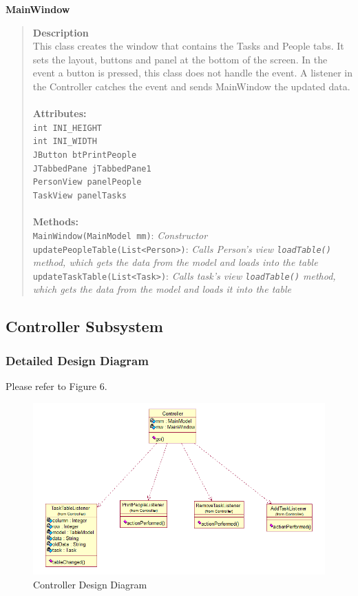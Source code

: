 \documentclass[12pt]{article}
\begin{document}
{\bf MainWindow}
\begin{quote}
{\bf Description}\\
This class creates the window that contains the Tasks and People tabs.  It sets the layout, buttons and panel at the bottom of the screen. In the event a button is pressed, this class does not handle the event.  A listener in the Controller catches the event and sends MainWindow the updated data.\\\\
{\bf Attributes:}\\
\texttt{int INI\_HEIGHT}\\
\texttt{int INI\_WIDTH}\\
\texttt{JButton btPrintPeople}\\
\texttt{JTabbedPane jTabbedPane1}\\
\texttt{PersonView panelPeople}\\
\texttt{TaskView panelTasks}\\\\
{\bf Methods:}\\
\texttt{MainWindow(MainModel mm)}:  \emph{Constructor}\\
\texttt{updatePeopleTable(List<Person>)}:  \emph{Calls Person's view \texttt{loadTable()} method, which gets the data from the model and loads into the table}\\
\texttt{updateTaskTable(List<Task>)}: \emph{Calls task's view \texttt{loadTable()} method, which gets the data from the model and loads it into the table}
\end{quote}

\subsection{Controller Subsystem}

\subsubsection{Detailed Design Diagram}

Please refer to Figure 6.

\begin{figure}[htbp]
\begin{center} \includegraphics[scale=.55]{Diagrams/controller_diagram.png} \end{center}
\caption{Controller Design Diagram}
\label{fig:model-diagram3}
\end{figure}
\end{document}
